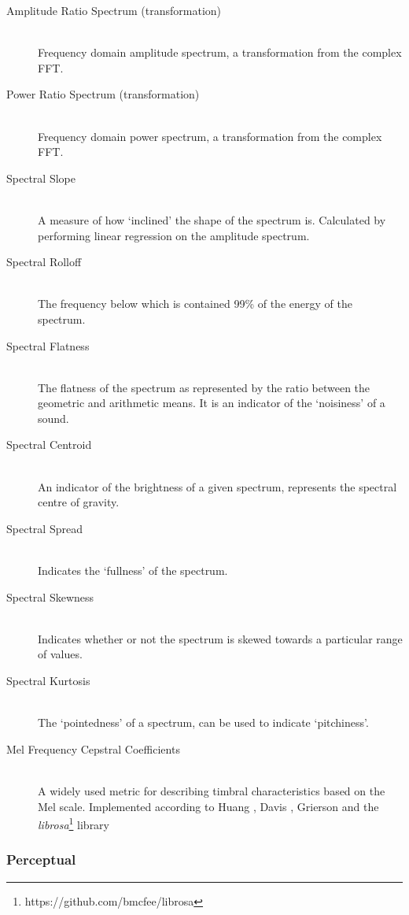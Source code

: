 \documentclass{sig-alternate}
\begin{document}
\begin{description}
	   \item[Amplitude Ratio Spectrum (transformation)]\hfill \\
       Frequency domain amplitude spectrum, a transformation from the complex FFT.
       \item[Power Ratio Spectrum (transformation)]\hfill \\
       Frequency domain power spectrum, a transformation from the complex FFT.
       \item[Spectral Slope]\hfill \\
       A measure of how `inclined' the shape of the spectrum is. Calculated by performing linear regression on the amplitude spectrum.
       \item[Spectral Rolloff]\hfill \\
       The frequency below which is contained 99\% of the energy of the spectrum.
       \item[Spectral Flatness]\hfill \\
       The flatness of the spectrum as represented by the ratio between the geometric and arithmetic means. It is an indicator of the `noisiness' of a sound.
       \item[Spectral Centroid]\hfill \\
       An indicator of the brightness of a given spectrum, represents the spectral centre of gravity.
       \item[Spectral Spread]\hfill \\
       Indicates the `fullness' of the spectrum.
       \item[Spectral Skewness]\hfill \\
       Indicates whether or not the spectrum is skewed towards a particular range of values.
       \item[Spectral Kurtosis]\hfill \\
       The `pointedness' of a spectrum, can be used to indicate `pitchiness'.
       \item[Mel Frequency Cepstral Coefficients]\hfill \\
       A widely used metric for describing timbral characteristics based on the Mel scale. Implemented according to Huang  \cite{huang2001}, Davis \cite{davis1980}, Grierson \cite{grierson2010} and the \emph{librosa}\footnote{https://github.com/bmcfee/librosa} library
\end{description}
\subsubsection{Perceptual}
\end{document}
